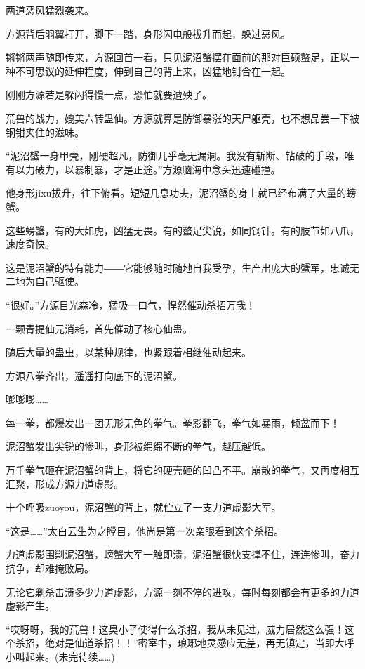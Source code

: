 \begin{this_body}
两道恶风猛烈袭来。

方源背后羽翼打开，脚下一踏，身形闪电般拔升而起，躲过恶风。

锵锵两声随即传来，方源回首一看，只见泥沼蟹摆在面前的那对巨硕螯足，正以一种不可思议的延伸程度，伸到自己的背上来，凶猛地钳合在一起。

刚刚方源若是躲闪得慢一点，恐怕就要遭殃了。

荒兽的战力，媲美六转蛊仙。方源就算是防御暴涨的天尸躯壳，也不想品尝一下被钢钳夹住的滋味。

“泥沼蟹一身甲壳，刚硬超凡，防御几乎毫无漏洞。我没有斩断、钻破的手段，唯有以力破力，以暴制暴，才是正途。”方源脑海中念头迅速碰撞。

他身形jixu拔升，往下俯看。短短几息功夫，泥沼蟹的身上就已经布满了大量的螃蟹。

这些螃蟹，有的大如虎，凶猛无畏。有的螯足尖锐，如同钢针。有的肢节如八爪，速度奇快。

这是泥沼蟹的特有能力――它能够随时随地自我受孕，生产出庞大的蟹军，忠诚无二地为自己驱使。

“很好。”方源目光森冷，猛吸一口气，悍然催动杀招万我！

一颗青提仙元消耗，首先催动了核心仙蛊。

随后大量的蛊虫，以某种规律，也紧跟着相继催动起来。

方源八拳齐出，遥遥打向底下的泥沼蟹。

嘭嘭嘭……

每一拳，都爆发出一团无形无色的拳气。拳影翻飞，拳气如暴雨，倾盆而下！

泥沼蟹发出尖锐的惨叫，身形被绵绵不断的拳气，越压越低。

万千拳气砸在泥沼蟹的背上，将它的硬壳砸的凹凸不平。崩散的拳气，又再度相互汇聚，形成方源力道虚影。

十个呼吸zuoyou，泥沼蟹的背上，就伫立了一支力道虚影大军。

“这是……”太白云生为之瞠目，他尚是第一次亲眼看到这个杀招。

力道虚影围剿泥沼蟹，螃蟹大军一触即溃，泥沼蟹很快支撑不住，连连惨叫，奋力抗争，却难掩败局。

无论它剿杀击溃多少力道虚影，方源一刻不停的进攻，每时每刻都会有更多的力道虚影产生。

“哎呀呀，我的荒兽！这臭小子使得什么杀招，我从未见过，威力居然这么强！这个杀招，绝对是仙道杀招！！”密室中，琅琊地灵感应无差，再无镇定，当即大呼小叫起来。(未完待续……)

\end{this_body}

